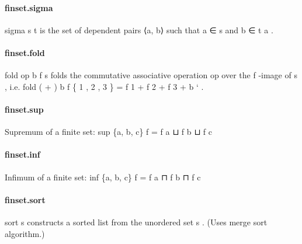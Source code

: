 \documentclass{article}
\begin{document}
\paragraph{finset.sigma}
\par
\colorbox[RGB]{253,246,227}{{{{\color[RGB]{101, 123, 131} sigma s t }}}} is the set of dependent pairs 
\colorbox[RGB]{253,246,227}{{{{\color[RGB]{101, 123, 131} ⟨a, b⟩ }}}} such that 
\colorbox[RGB]{253,246,227}{{{{\color[RGB]{101, 123, 131} a ∈ s }}}} and 
\colorbox[RGB]{253,246,227}{{{{\color[RGB]{101, 123, 131} b ∈ t a }}}}.
\paragraph{finset.fold}
\par
\colorbox[RGB]{253,246,227}{{{{\color[RGB]{101, 123, 131} fold op b f s }}}} folds the commutative associative operation 
\colorbox[RGB]{253,246,227}{{{{\color[RGB]{101, 123, 131} op }}}} over the
\colorbox[RGB]{253,246,227}{{{{\color[RGB]{101, 123, 131} f }}}}-image of 
\colorbox[RGB]{253,246,227}{{{{\color[RGB]{101, 123, 131} s }}}}, i.e. 
\colorbox[RGB]{253,246,227}{{{{\color[RGB]{101, 123, 131} fold ( }}}{{{\color[RGB]{181, 137, 0} + }}}{{{\color[RGB]{101, 123, 131} ) b f \{ }}}{{{\color[RGB]{108, 113, 196} 1 }}}{{{\color[RGB]{101, 123, 131} , }}}{{{\color[RGB]{108, 113, 196} 2 }}}{{{\color[RGB]{101, 123, 131} , }}}{{{\color[RGB]{108, 113, 196} 3 }}}{{{\color[RGB]{101, 123, 131} \}  }}}{{{\color[RGB]{181, 137, 0} = }}}{{{\color[RGB]{101, 123, 131}   }}}}f 1 + f 2 + f 3 + b
`
.
\paragraph{finset.sup}
\par
Supremum of a finite set: 
\colorbox[RGB]{253,246,227}{{{{\color[RGB]{101, 123, 131} sup \{a, b, c\} f  }}}{{{\color[RGB]{181, 137, 0} = }}}{{{\color[RGB]{101, 123, 131}  f a ⊔ f b ⊔ f c }}}}\paragraph{finset.inf}
\par
Infimum of a finite set: 
\colorbox[RGB]{253,246,227}{{{{\color[RGB]{101, 123, 131} inf \{a, b, c\} f  }}}{{{\color[RGB]{181, 137, 0} = }}}{{{\color[RGB]{101, 123, 131}  f a ⊓ f b ⊓ f c }}}}\paragraph{finset.sort}
\par
\colorbox[RGB]{253,246,227}{{{{\color[RGB]{101, 123, 131} sort s }}}} constructs a sorted list from the unordered set 
\colorbox[RGB]{253,246,227}{{{{\color[RGB]{101, 123, 131} s }}}}.
(Uses merge sort algorithm.)
\end{document}
